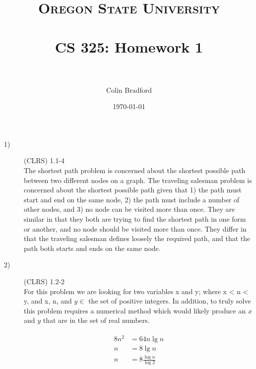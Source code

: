 \documentclass[paper=a4, fontsize=11pt]{scrartcl} %
\title{ 
\normalfont \normalsize 
\textsc{Oregon State University} \\ [25pt]
\horrule{0.5pt} \\[0.4cm] %
\huge CS 325: Homework 1 \\ %
\horrule{2pt} \\[0.5cm] %
}
\author{Colin Bradford} %
\date{\normalsize\today} %
\numberwithin{equation}{section} %
\numberwithin{figure}{section} %
\numberwithin{table}{section} %
\begin{document}
\maketitle %

\begin{description}
    \item[1)] (CLRS) 1.1-4 \hfill \\
        The shortest path problem is concerned about the shortest possible path between two different
        nodes on a graph. The traveling salesman problem is concerned about the shortest possible path
        given that 1) the path must start and end on the same node, 2) the path must include a number
        of other nodes, and 3) no node can be visited more than once. They are similar in that they 
        both are trying to find the shortest path in one form or another, and no node should be visited
        more than once. They differ in that the traveling salesman defines loosely the required path, and
        that the path both starts and ends on the same node.
    \item[2)] (CLRS) 1.2-2 \hfill \\
        For this problem we are looking for two variables x and y; where x < n < y, and x, n, and 
        $y \in$ the set of positive integers. In addition, to truly solve this problem requires a numerical method 
        which would likely produce an $x$ and $y$ that are in the set of real numbers.
        
        \begin{align} 
        \begin{split}
            8n^2    &= 64n\lg{n}\\
            n       &= 8\lg{n}\\
            n       &= 8\frac{\log{n}}{\log{2}}
        \end{split}                 
        \end{align}
        

\end{description}
\end{document}

